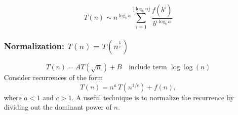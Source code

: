 \documentclass[9pt]{extarticle}
\begin{document}
\[T(n) \sim n^{\log_ba} \sum_{i=1}^{\lfloor \log_b n\rfloor}\frac{f(b^i)}{b^{i\log_b a}}\]




\subsubsection{Normalization: $T(n) = T(n^{\frac{1}{c}})$}
\[T(n) = AT(\sqrt{n}) + B \quad\text{include term } \log\log(n)\]
Consider recurrences of the form
\[
T(n) = n^{a} \, T\!\left(n^{1/c}\right) + f(n),
\]
where $a < 1$ and $c > 1$.  A useful technique is to normalize the
recurrence by dividing out the dominant power of $n$.
\end{document}
